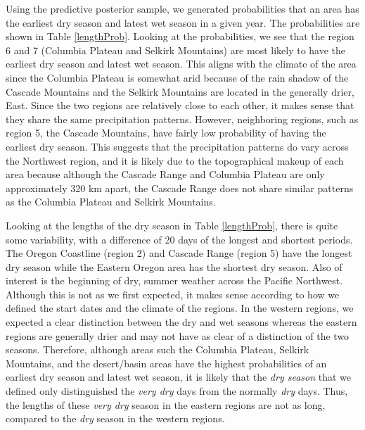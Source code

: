 \documentclass{article}
\begin{document}
Using the predictive posterior sample, we generated probabilities that an area has the earliest dry season and latest wet season in a given year. The probabilities are shown in Table \ref{lengthProb}. Looking at the probabilities, we see that the region 6 and 7 (Columbia Plateau and Selkirk Mountains) are most likely to have the earliest dry season and latest wet season. This aligns with the climate of the area since the Columbia Plateau is somewhat arid because of the rain shadow of the Cascade Mountains and the Selkirk Mountains are located in the generally drier, East. Since the two regions are relatively close to each other, it makes sense that they share the same precipitation patterns. However, neighboring regions, such as region 5, the Cascade Mountains, have fairly low probability of having the earliest dry season. This suggests that the precipitation patterns do vary across the Northwest region, and it is likely due to the topographical makeup of each area because although the Cascade Range and Columbia Plateau are only approximately 320 km apart, the Cascade Range does not share similar patterns as the Columbia Plateau and Selkirk Mountains. 

Looking at the lengths of the dry season in Table \ref{lengthProb}, there is quite some variability, with a difference of 20 days of the longest and shortest periods.  The Oregon Coastline (region 2) and Cascade Range (region 5) have the longest dry season while the Eastern Oregon area has the shortest dry season. 
Also of interest is the beginning of dry, summer weather across the Pacific Northwest. Although this is not as we first expected, it makes sense according to how we defined the start dates and the climate of the regions. In the western regions, we expected a clear distinction between the dry and wet seasons whereas the eastern regions are generally drier and may not have as clear of a distinction of the two seasons. Therefore, although areas such the Columbia Plateau, Selkirk Mountains, and the desert/basin areas have the highest probabilities of an earliest dry season and latest wet season, it is likely that the \textit{dry season} that we defined only distinguished the \textit{very dry} days from the normally \textit{dry} days. Thus, the lengths of these \textit{very dry} season in the eastern regions are not as long, compared to the \textit{dry} season in the western regions. 
\end{document}
